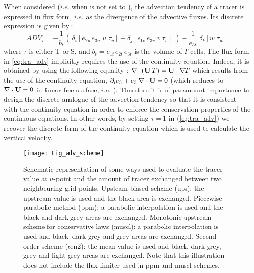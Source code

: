 \documentclass[../tex_main/NEMO_manual]{subfiles}
\begin{document}
When considered ($i.e.$ when  is not set to ), 
the advection tendency of a tracer is expressed in flux form, 
$i.e.$ as the divergence of the advective fluxes. Its discrete expression is given by :
\begin{equation} \label{eq:tra_adv}
ADV_\tau =-\frac{1}{b_t} \left( 
\;\delta _i \left[ e_{2u}\,e_{3u} \;  u\; \tau _u  \right]
+\delta _j \left[ e_{1v}\,e_{3v}  \;  v\; \tau _v  \right] \; \right)
-\frac{1}{e_{3t}} \;\delta _k \left[ w\; \tau _w \right]
\end{equation}
where $\tau$ is either T or S, and $b_t= e_{1t}\,e_{2t}\,e_{3t}$ is the volume of $T$-cells. 
The flux form in \autoref{eq:tra_adv} 
implicitly requires the use of the continuity equation. Indeed, it is obtained
by using the following equality : $\nabla \cdot \left( \mathbf{U}\,T \right)=\mathbf{U} \cdot \nabla T$ 
which results from the use of the continuity equation,  $\partial _t e_3 + e_3\;\nabla \cdot \mathbf{U}=0$ 
(which reduces to $\nabla \cdot \mathbf{U}=0$ in linear free surface, $i.e.$ ). 
Therefore it is of paramount importance to design the discrete analogue of the 
advection tendency so that it is consistent with the continuity equation in order to 
enforce the conservation properties of the continuous equations. In other words, 
by setting $\tau = 1$ in (\autoref{eq:tra_adv}) we recover the discrete form of 
the continuity equation which is used to calculate the vertical velocity.
\begin{figure}[!t] 	 \begin{center}
\texttt{[image: Fig\_adv\_scheme]}
\caption{	\protect\label{fig:adv_scheme} 
Schematic representation of some ways used to evaluate the tracer value 
at $u$-point and the amount of tracer exchanged between two neighbouring grid 
points. Upsteam biased scheme (ups): the upstream value is used and the black 
area is exchanged. Piecewise parabolic method (ppm): a parabolic interpolation 
is used and the black and dark grey areas are exchanged. Monotonic upstream 
scheme for conservative laws (muscl):  a parabolic interpolation is used and black, 
dark grey and grey areas are exchanged. Second order scheme (cen2): the mean 
value is used and black, dark grey, grey and light grey areas are exchanged. Note 
that this illustration does not include the flux limiter used in ppm and muscl schemes.}
\end{center}   \end{figure}
\end{document}
